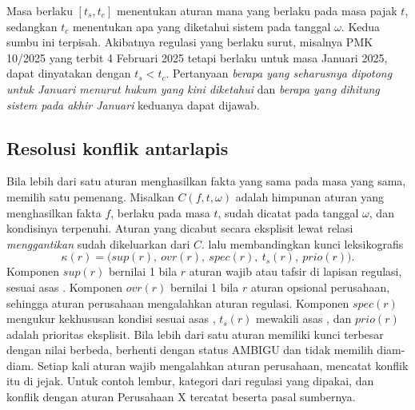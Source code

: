 Masa berlaku $[t_s, t_e]$ menentukan aturan mana yang berlaku pada masa pajak $t$, sedangkan $t_c$ menentukan apa yang diketahui sistem pada tanggal $\omega$. Kedua sumbu ini terpisah. Akibatnya regulasi yang berlaku surut, misalnya PMK 10/2025 yang terbit 4 Februari 2025 tetapi berlaku untuk masa Januari 2025, dapat dinyatakan dengan $t_s < t_c$. Pertanyaan \emph{berapa yang seharusnya dipotong untuk Januari menurut hukum yang kini diketahui} dan \emph{berapa yang dihitung sistem pada akhir Januari} keduanya dapat dijawab.


\subsection{Resolusi konflik antarlapis}
\label{subsec:resolusi}

Bila lebih dari satu aturan menghasilkan fakta yang sama pada masa yang sama,  memilih satu pemenang. Misalkan $C(f, t, \omega)$ adalah himpunan aturan yang menghasilkan fakta $f$, berlaku pada masa $t$, sudah dicatat pada tanggal $\omega$, dan kondisinya terpenuhi. Aturan yang dicabut secara eksplisit lewat relasi \emph{menggantikan} sudah dikeluarkan dari $C$.  lalu membandingkan kunci leksikografis
\begin{equation}
\kappa(r) = \big(\mathit{sup}(r),\ \mathit{ovr}(r),\ \mathit{spec}(r),\ t_s(r),\ \mathit{prio}(r)\big).
\label{eq:kunci}
\end{equation}
Komponen $\mathit{sup}(r)$ bernilai 1 bila $r$ aturan wajib atau tafsir di lapisan regulasi, sesuai asas . Komponen $\mathit{ovr}(r)$ bernilai 1 bila $r$ aturan opsional perusahaan, sehingga aturan perusahaan mengalahkan aturan  regulasi. Komponen $\mathit{spec}(r)$ mengukur kekhususan kondisi sesuai asas , $t_s(r)$ mewakili asas , dan $\mathit{prio}(r)$ adalah prioritas eksplisit. Bila lebih dari satu aturan memiliki kunci terbesar dengan nilai berbeda,  berhenti dengan status AMBIGU dan tidak memilih diam-diam. Setiap kali aturan wajib mengalahkan aturan perusahaan,  mencatat konflik itu di jejak. Untuk contoh lembur, kategori dari regulasi yang dipakai, dan konflik dengan aturan Perusahaan X tercatat beserta pasal sumbernya.

